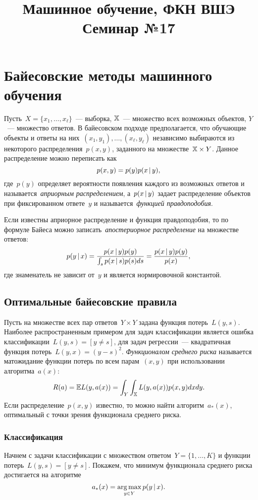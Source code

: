 \documentclass[12pt,fleqn]{article}
\title{Машинное обучение, ФКН ВШЭ\\Семинар №17}
\author{}
\date{}
\begin{document}
	\maketitle

\section{Байесовские методы машинного обучения}
Пусть~$X = \{x_1, \dots, x_\ell\}$~--- выборка,
$\mathbb{X}$~--- множество всех возможных объектов,
$Y$~--- множество ответов.
В байесовском подходе предполагается, что обучающие
объекты и ответы на них~$(x_1, y_1), \dots, (x_\ell, y_\ell)$ независимо выбираются
из некоторого распределения~$p(x, y)$, заданного на множестве~$\XX \times Y$.
Данное распределение можно переписать как
\[
    p(x, y)
    =
    p(y) p(x \mspace{3mu}{|}\mspace{3mu} y),
\]
где~$p(y)$ определяет вероятности появления каждого из возможных ответов
и называется~\emph{априорным распределением},
а~$p(x \mspace{3mu}{|}\mspace{3mu} y)$ задает распределение объектов при фиксированном ответе~$y$
и называется~\emph{функцией правдоподобия}.

Если известны априорное распределение и функция правдоподобия,
то по формуле Байеса можно записать~\emph{апостериорное распределение}
на множестве ответов:
\[
    p(y \mspace{3mu}{|}\mspace{3mu} x)
    =
    \frac{
        p(x \mspace{3mu}{|}\mspace{3mu} y) p(y)
    }{
        \int_s p(x \mspace{3mu}{|}\mspace{3mu} s) p(s) ds
    }
    =
    \frac{
        p(x \mspace{3mu}{|}\mspace{3mu} y) p(y)
    }{
        p(x)
    },
\]
где знаменатель не зависит от~$y$ и является нормировочной константой.

\subsection{Оптимальные байесовские правила}
Пусть на множестве всех пар ответов~$Y \times Y$ задана функция
потерь~$L(y, s)$.
Наиболее распространенным примером для задач классификации
является ошибка классификации~$L(y, s) = [y \neq s]$,
для задач регрессии~--- квадратичная функция потерь~$L(y, x) = (y - s)^2$.
\emph{Функционалом среднего риска} называется матожидание функции потерь
по всем парам~$(x, y)$ при использовании алгоритма~$a(x)$:
\[
    R(a) = \mathbb{E} L(y, a(x))
    =
    \int_{Y} \int_{\mathbb{X}} L(y, a(x)) p(x, y) dx dy.
\]
Если распределение~$p(x, y)$ известно, то можно найти алгоритм~$a_*(x)$,
оптимальный с точки зрения функционала среднего риска.

\subsubsection{Классификация}
Начнем с задачи классификации с множеством ответом~$Y = \{1, \dots, K\}$
и функции потерь~$L(y, s) = [y \neq s]$.
Покажем, что минимум функционала среднего риска достигается
на алгоритме
\[
    a_*(x) = \mathop{\rm arg\,max}\limits_{y \in Y} p(y \mspace{3mu}{|}\mspace{3mu} x).
\]
\end{document}
